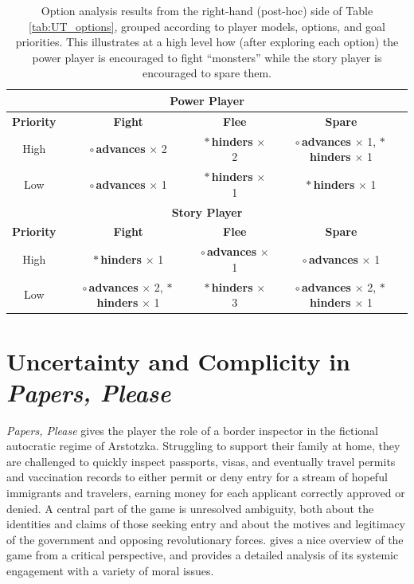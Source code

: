 \documentclass[arts,article,accept,moreauthors,pdftex,10pt,a4paper]{Definitions/mdpi}
\newcommand{\badsym}{$\ast$}
\newcommand{\goodsym}{$\circ$}
\newcommand{\ncemph}[1]{\textbf{\sffamily #1}}
\newcommand{\advances}{\ncemph{\color{advances}\goodsym{}\,advances}}
\newcommand{\hinders}{\ncemph{\color{hinders}\badsym{}\,hinders}}
\begin{document}
\begin{table}[H]
\centering
\begin{tabular}{c c c c }
  \toprule
\multicolumn{4}{c}{\textbf{Power Player}} \\
  \midrule
  \textbf{Priority} & \textbf{Fight} & \textbf{Flee} & \textbf{Spare} \\
  \midrule
  \centering High & \advances{} $\times$ 2 & \hinders{} $\times$ 2 & \advances{} $\times$ 1, \hinders{} $\times$ 1  \\
  \midrule
  \centering Low & \advances{} $\times$ 1 & \hinders{} $\times$ 1 & \hinders{} $\times$ 1 \\
\midrule
\multicolumn{4}{c}{\textbf{Story Player}} \\
  \midrule
  \textbf{Priority} & \textbf{Fight} & \textbf{Flee} & \textbf{Spare} \\
    \midrule
  \centering High & \hinders{} $\times$ 1 & \advances{} $\times$ 1 & \advances{} $\times$ 1  \\
  \midrule
  \centering Low & \advances{} $\times$ 2, \hinders{} $\times$ 1 & \hinders{} $\times$ 3 & \advances{} $\times$ 2, \hinders{} $\times$ 1 \\
  \bottomrule
\end{tabular}
  \caption[\emph{Undertale}option summary]{Option analysis results from the right-hand (post-hoc) side of Table \ref{tab:UT_options}, grouped according to player models, options, and goal priorities. This illustrates at a high level how (after exploring each option) the power player is encouraged to fight ``monsters'' while the story player is encouraged to spare them.}
\label{tab:UT_option_summary}
\end{table}



\section{Uncertainty and Complicity in \emph{Papers, Please}}

\emph{Papers, Please} \citep{pope2013papers} gives the player the role of a border inspector in the fictional autocratic regime of Arstotzka.
%
Struggling to support their family at home, they are challenged to quickly inspect passports, visas, and eventually travel permits and vaccination records to either permit or deny entry for a stream of hopeful immigrants and travelers, earning money for each applicant correctly approved or denied.
%
A central part of the game is unresolved ambiguity, both about the identities and claims of those seeking entry and about the motives and legitimacy of the government and opposing revolutionary forces.
%
\cite{alexander2013designing} gives a nice overview of the game from a critical perspective, and \cite{formosa2016papers} provides a detailed analysis of its systemic engagement with a variety of moral issues.
\end{document}
